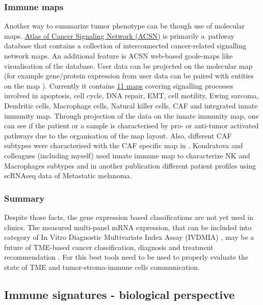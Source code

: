 \documentclass[12pt,]{book}
\theoremstyle{definition}
\theoremstyle{definition}
\theoremstyle{definition}
\theoremstyle{remark}
\begin{document}
\hypertarget{immune-maps}{%
\subsubsection{Immune maps}\label{immune-maps}}

Another way to summarize tumor phenotype can be though use of molecular
maps. \href{https://acsn.curie.fr/}{Atlas of Cancer Signaling Network
(ACSN)} \citep{Kuperstein2013, Kuperstein2015} is primarily a~pathway
database that contains a collection of interconnected cancer-related
signalling network maps. An additional feature is ACSN web-based
goole-maps like visualisation of the database. User data can be
projected on the molecular map (for example gene/protein expression from
user data can be paired with entities on the map ). Currently it
contains \href{https://navicell.curie.fr/}{11 maps} covering signalling
processes involved in apoptosis, cell cycle, DNA repair, EMT, cell
motility, Ewing sarcoma, Dendritic cells, Macrophage cells, Natural
killer cells, CAF and integrated innate immunity map. Through projection
of the data on the innate immunity map, one can see if the patient or a
sample is characterised by pro- or anti-tumor activated pathways due to
the organisation of the map layout. Also, different CAF subtypes were
characterised with the CAF specific map in \citep{Costa2018}. Kondratova
and colleagues (including myself) used innate immune map to characterize
NK and Macrophages subtypes and in another publication
\citep{Kondratova2018} different patient profiles using scRNAseq data of
Metastatic melanoma.

\hypertarget{summary-1}{%
\subsubsection{Summary}\label{summary-1}}

Despite those facts, the gene expression based classifications are not
yet used in clinics. The measured multi-panel mRNA expression, that can
be included into category of In Vitro Diagnostic Multivariate Index
Assay (IVDMIA) \citep{Gyorffy2015, Ross2008}, may be a future of
TME-based cancer classification, diagnosis and treatment recommendation
\citep{Gnjatic2017}. For this best tools need to be used to properly
evaluate the state of TME and tumor-stroma-immune cells communication.

\hypertarget{immune-signatures}{%
\subsection{Immune signatures - biological
perspective}\label{immune-signatures}}
\end{document}
